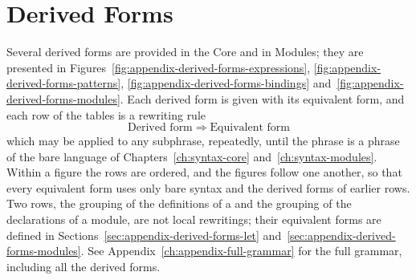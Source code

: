 \chapter{Derived Forms}\label{ch:appendix-derived-forms}

Several derived forms are provided in the Core and in Modules; they are
presented in Figures~\ref{fig:appendix-derived-forms-expressions},
\ref{fig:appendix-derived-forms-patterns},
\ref{fig:appendix-derived-forms-bindings}
and~\ref{fig:appendix-derived-forms-modules}. Each derived form is given with
its equivalent form, and each row of the tables is a rewriting rule
\[
  \text{Derived form} \;\Longrightarrow\; \text{Equivalent form}
\]
which may be applied to any subphrase, repeatedly, until the phrase is a
phrase of the bare language of Chapters~\ref{ch:syntax-core}
and~\ref{ch:syntax-modules}. Within a figure the rows are ordered, and the
figures follow one another, so that every equivalent form uses only bare
syntax and the derived forms of earlier rows. %
Two rows, the grouping of the definitions of a  and the grouping of the
declarations of a module, are not local rewritings; their equivalent forms
are defined in Sections~\ref{sec:appendix-derived-forms-let}
and~\ref{sec:appendix-derived-forms-modules}. See
Appendix~\ref{ch:appendix-full-grammar} for the full grammar, including all
the derived forms.

